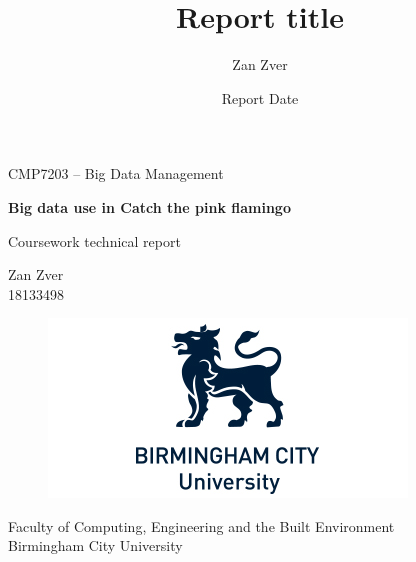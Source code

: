 \documentclass[12pt,a4paper]{article}
\title{Report title}
\author{Zan Zver}
\date{Report Date }
\newcommand{\authorName}{Zan Zver}
\newcommand{\authorID}{18133498}
\newcommand{\reportTitle}{Big data use in Catch the pink flamingo}
\begin{document}
\begin{titlepage}
   \begin{center}
       CMP7203 – Big Data Management
       \vspace*{0.5cm}

       \huge\textbf{\reportTitle} 

       \vspace{0.5cm}
        Coursework technical report
            
       \vspace{1.5cm}

       \authorName \\
       \authorID


       \vfill
            
       \vspace{0.8cm}
     
       \begin{figure}[htp]
        \centering
        \includegraphics{logo}
        \end{figure}
            
       \large{Faculty of Computing, Engineering and the Built Environment \\
       Birmingham City University \\}
            
   \end{center}
\end{titlepage}
\pagestyle{fancy}
\fancyhf{}
\setlength{\headsep}{50pt}

\tableofcontents

\listoftables
\end{document}
